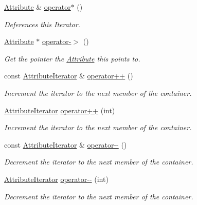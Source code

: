 \begin{DoxyCompactItemize}
\hyperlink{classphys_1_1xml_1_1Attribute}{Attribute} \& \hyperlink{classphys_1_1xml_1_1AttributeIterator_afe43d9e4a66adadf8eedc3fbcb883bcd}{operator$\ast$} ()
\begin{DoxyCompactList}\small\item\em Deferences this Iterator. \item\end{DoxyCompactList}\item 
\hyperlink{classphys_1_1xml_1_1Attribute}{Attribute} $\ast$ \hyperlink{classphys_1_1xml_1_1AttributeIterator_a77fb7dfd9b834d6663201870e8550217}{operator-\/$>$} ()
\begin{DoxyCompactList}\small\item\em Get the pointer the \hyperlink{classphys_1_1xml_1_1Attribute}{Attribute} this points to. \item\end{DoxyCompactList}\item 
\hypertarget{classphys_1_1xml_1_1AttributeIterator_ad09623beef0359e64bc6b5a2635cd34a}{
const \hyperlink{classphys_1_1xml_1_1AttributeIterator}{AttributeIterator} \& \hyperlink{classphys_1_1xml_1_1AttributeIterator_ad09623beef0359e64bc6b5a2635cd34a}{operator++} ()}
\label{classphys_1_1xml_1_1AttributeIterator_ad09623beef0359e64bc6b5a2635cd34a}

\begin{DoxyCompactList}\small\item\em Increment the iterator to the next member of the container. \item\end{DoxyCompactList}\item 
\hyperlink{classphys_1_1xml_1_1AttributeIterator}{AttributeIterator} \hyperlink{classphys_1_1xml_1_1AttributeIterator_a2109817056f299a9f2b132ade6901800}{operator++} (int)
\begin{DoxyCompactList}\small\item\em Increment the iterator to the next member of the container. \item\end{DoxyCompactList}\item 
const \hyperlink{classphys_1_1xml_1_1AttributeIterator}{AttributeIterator} \& \hyperlink{classphys_1_1xml_1_1AttributeIterator_a76a060aab7cc7666cd5016035de714b0}{operator-\/-\/} ()
\begin{DoxyCompactList}\small\item\em Decrement the iterator to the next member of the container. \item\end{DoxyCompactList}\item 
\hyperlink{classphys_1_1xml_1_1AttributeIterator}{AttributeIterator} \hyperlink{classphys_1_1xml_1_1AttributeIterator_ab8b0d4867b14816c80cf74ac7a0a1561}{operator-\/-\/} (int)
\begin{DoxyCompactList}\small\item\em Decrement the iterator to the next member of the container. \item\end{DoxyCompactList}\end{DoxyCompactItemize}
